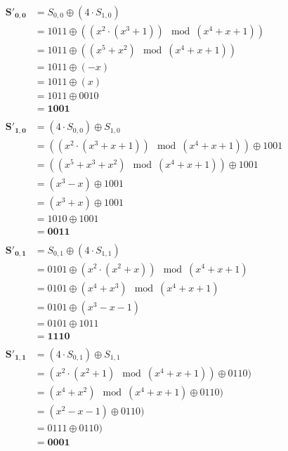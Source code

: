 \documentclass[
    article,            %
    11pt,               %
    oneside,            %
    a4paper,            %
    english,            %
    brazil,             %
    sumario=tradicional,
    ]{abntex2}
\begin{document}
\begin{align*}
\mathbf{S'_{0,0}} &= S_{0,0} \oplus (4 \cdot S_{1,0}) \\
                  &= 1011 \oplus ((x^2 \cdot (x^3 + 1)) \mod (x^4 + x + 1)) \\
                  &= 1011 \oplus ((x^5 + x^2) \mod (x^4 + x + 1)) \\
                  &= 1011 \oplus (-x) \\
                  &= 1011 \oplus (x) \\
                  &= 1011 \oplus 0010 \\
                  &= \mathbf{1001} \\\\
\mathbf{S'_{1,0}} &= (4 \cdot S_{0,0}) \oplus S_{1,0}  \\
                  &= ((x^2 \cdot (x^3+x+1)) \mod (x^4 + x + 1)) \oplus 1001 \\
                  &= ((x^5 + x^3 + x^2) \mod (x^4 + x + 1)) \oplus 1001 \\
                  &= (x^3-x) \oplus 1001 \\
                  &= (x^3+x) \oplus 1001 \\
                  &= 1010 \oplus 1001 \\
                  &= \mathbf{0011} \\\\
\mathbf{S'_{0,1}} &= S_{0,1} \oplus (4 \cdot S_{1,1}) \\
                  &= 0101 \oplus (x^2 \cdot (x^2 + x)) \mod (x^4 + x + 1) \\
                  &= 0101 \oplus (x^4 + x^3) \mod (x^4 + x + 1) \\
                  &= 0101 \oplus (x^3-x-1) \\
                  &= 0101 \oplus 1011 \\
                  &= \mathbf{1110} \\\\
\mathbf{S'_{1,1}} &= (4 \cdot S_{0,1}) \oplus S_{1,1}  \\
                  &= (x^2 \cdot (x^2+1) \mod (x^4 + x + 1)) \oplus 0110) \\
                  &= (x^4+x^2) \mod (x^4 + x + 1) \oplus 0110) \\
                  &= (x^2-x-1) \oplus 0110) \\
                  &= 0111 \oplus 0110) \\
                  &= \mathbf{0001} \\\\
\end{align*}
\end{document}
